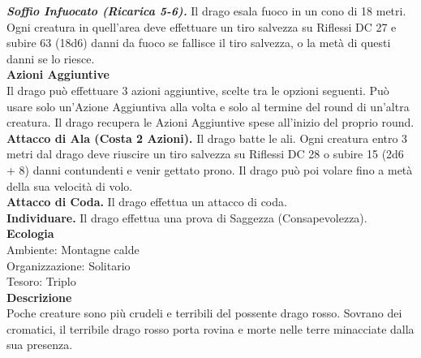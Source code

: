 \begin{multicols}{2}
\emph{\textbf{Soffio Infuocato (Ricarica 5-6).}} Il drago esala fuoco in  un cono di 18 metri. Ogni creatura in quell'area deve effettuare un tiro salvezza su Riflessi DC  27 e subire 63 (18d6) danni da fuoco se fallisce il tiro salvezza, o la metà di questi danni se lo riesce.\\
\textbf{Azioni Aggiuntive}\\
Il drago può effettuare 3 azioni aggiuntive, scelte tra le opzioni seguenti. Può usare solo un'Azione Aggiuntiva alla volta e solo al termine del round di un'altra creatura. Il drago recupera le Azioni Aggiuntive spese all'inizio del proprio round.\\
\textbf{Attacco di Ala (Costa 2 Azioni).} Il drago batte le ali. Ogni creatura entro 3 metri dal drago deve riuscire un tiro salvezza su Riflessi DC  28 o subire 15 (2d6 + 8) danni contundenti e venir gettato prono. Il drago può poi volare fino a metà della sua velocità di volo.\\
\textbf{Attacco di Coda.} Il drago effettua un attacco di coda.\\
\textbf{Individuare.} Il drago effettua una prova di Saggezza (Consapevolezza).\\
\textbf{Ecologia}\\
Ambiente: Montagne calde\\
Organizzazione: Solitario\\
Tesoro: Triplo\\
\textbf{Descrizione}\\
Poche creature sono più crudeli e terribili del possente drago rosso. Sovrano dei cromatici, il terribile drago rosso porta rovina e morte nelle terre minacciate dalla sua presenza.\\


\end{multicols}
